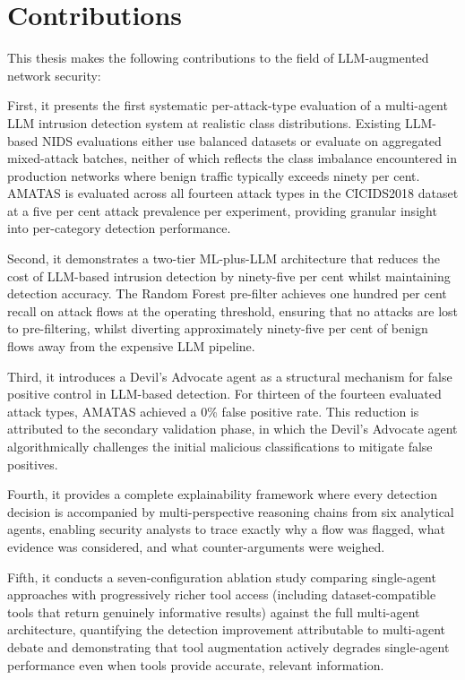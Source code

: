 \documentclass[../main.tex]{subfiles}
\begin{document}
\section{Contributions}
\label{sec:contributions}

This thesis makes the following contributions to the field of LLM-augmented network security:

First, it presents the first systematic per-attack-type evaluation of a multi-agent LLM intrusion detection system at realistic class distributions. Existing LLM-based NIDS evaluations either use balanced datasets or evaluate on aggregated mixed-attack batches, neither of which reflects the class imbalance encountered in production networks where benign traffic typically exceeds ninety per cent. AMATAS is evaluated across all fourteen attack types in the CICIDS2018 dataset at a five per cent attack prevalence per experiment, providing granular insight into per-category detection performance.

Second, it demonstrates a two-tier ML-plus-LLM architecture that reduces the cost of LLM-based intrusion detection by ninety-five per cent whilst maintaining detection accuracy. The Random Forest pre-filter achieves one hundred per cent recall on attack flows at the operating threshold, ensuring that no attacks are lost to pre-filtering, whilst diverting approximately ninety-five per cent of benign flows away from the expensive LLM pipeline.

Third, it introduces a Devil's Advocate agent as a structural mechanism for false positive control in LLM-based detection. For thirteen of the fourteen evaluated attack types, AMATAS achieved a 0\% false positive rate. This reduction is attributed to the secondary validation phase, in which the Devil's Advocate agent algorithmically challenges the initial malicious classifications to mitigate false positives.

Fourth, it provides a complete explainability framework where every detection decision is accompanied by multi-perspective reasoning chains from six analytical agents, enabling security analysts to trace exactly why a flow was flagged, what evidence was considered, and what counter-arguments were weighed.

Fifth, it conducts a seven-configuration ablation study comparing single-agent approaches with progressively richer tool access (including dataset-compatible tools that return genuinely informative results) against the full multi-agent architecture, quantifying the detection improvement attributable to multi-agent debate and demonstrating that tool augmentation actively degrades single-agent performance even when tools provide accurate, relevant information.
\end{document}
